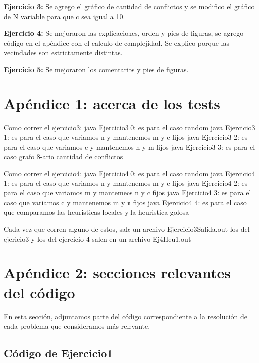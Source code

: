 \documentclass[a4paper]{article}
\begin{document}
\textbf{Ejercicio 3:} Se agrego el gr\'afico de cantidad de conflictos y se modifico el gr\'afico de N variable para que c sea igual a 10.

\textbf{Ejercicio 4:} Se mejoraron las explicaciones, orden y pies de figuras, se agrego código en el apéndice con el calculo de complejidad. Se explico porque las vecindades son estrictamente distintas.

\textbf{Ejercicio 5:} Se mejoraron los comentarios y pies de figuras.
\section{Apéndice 1: acerca de los tests}

Como correr el ejercicio3:
java Ejercicio3 0: es para el caso random
java Ejercicio3 1: es para el caso que variamos n y mantenemos m y c fijos
java Ejercicio3 2: es para el caso que variamos c y mantenemos n y m fijos
java Ejercicio3 3: es para el caso grafo 8-ario cantidad de conflictos

Como correr el ejercicio4:
java Ejercicio4 0: es para el caso random
java Ejercicio4 1: es para el caso que variamos n y mantenemos m y c fijos
java Ejercicio4 2: es para el caso que variamos m y mantemeos n y c fijos
java Ejercicio4 3: es para el caso que variamos c y mantenemos m y n fijos
java Ejercicio4 4: es para el caso que comparamos las heuristicas locales y la heuristica golosa


Cada vez que corren alguno de estos, sale un archivo Ejercicio3Salida.out los del ejericio3
y los del ejercicio 4 salen en un archivo Ej4Heu1.out

\newpage
\section{Apéndice 2: secciones relevantes del código}
En esta sección, adjuntamos parte del código correspondiente a la resolución de cada problema
que consideramos más relevante.

\subsection{Código de Ejercicio1}
\end{document}
